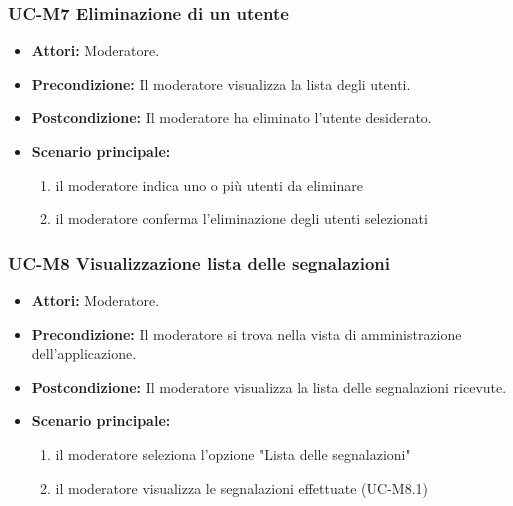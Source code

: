 \subsubsection{UC-M7 Eliminazione di un utente}
\begin{itemize}
	\item \textbf{Attori:} Moderatore.
	\item \textbf{Precondizione:} Il moderatore visualizza la lista degli utenti.
	\item \textbf{Postcondizione:} Il moderatore ha eliminato l'utente desiderato.
	\item \textbf{Scenario principale:}
	\begin{enumerate}
		\item il moderatore indica uno o più utenti da eliminare
		\item il moderatore conferma l'eliminazione degli utenti selezionati
	\end{enumerate}
\end{itemize}

\subsubsection{UC-M8 Visualizzazione lista delle segnalazioni}
\begin{itemize}
	\item \textbf{Attori:} Moderatore.
	\item \textbf{Precondizione:} Il moderatore si trova nella vista di amministrazione dell'applicazione.
	\item \textbf{Postcondizione:} Il moderatore visualizza la lista delle segnalazioni ricevute.
	\item \textbf{Scenario principale:}
	\begin{enumerate}
		\item il moderatore seleziona l'opzione "Lista delle segnalazioni"
		\item il moderatore visualizza le segnalazioni effettuate (UC-M8.1)
	\end{enumerate}
\end{itemize}

